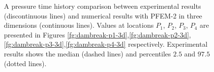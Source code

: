 \begin{figure}[h]
{    }
   \caption{A pressure time history comparison between experimental results\cite{Lobovsky13} (discontinuous lines) and numerical results with PFEM-2 in three dimensions (continuous lines). Values at locations $P_1$, $P_2$, $P_3$, $P_4$ are presented in Figures \ref{fg:dambreak-p1-3d},\ref{fg:dambreak-p2-3d},\ref{fg:dambreak-p3-3d},\ref{fg:dambreak-p4-3d} respectively. Experimental results shows the median (dashed lines) and percentiles $2.5$ and $97.5$ (dotted lines).}
   \label{fg:dambreak-p-3d}                %
\end{figure}
\clearpage

